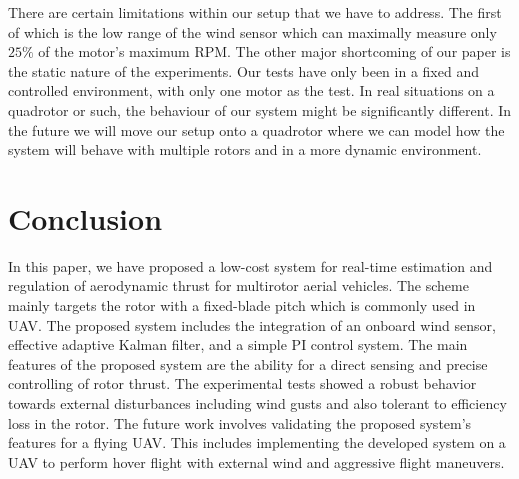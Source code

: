 \documentclass[conference]{IEEEtran}
\begin{document}
There are certain limitations within our setup that we have to address. The first of which is the low range of the wind sensor which can maximally measure only $25\%$ of the motor's maximum RPM. The other major shortcoming of our paper is the static nature of the experiments. Our tests have only been in a fixed and controlled environment, with only one motor as the test. In real situations on a quadrotor or such, the behaviour of our system might be significantly different. In the future we will move our setup onto a quadrotor where we can model how the system will behave with multiple rotors and in a more dynamic environment.
\section{Conclusion}

In this paper, we have proposed a low-cost system for real-time estimation and regulation of aerodynamic thrust for multirotor aerial vehicles. The scheme mainly targets the rotor with a fixed-blade pitch which is commonly used in UAV. The proposed system includes the integration of an onboard wind sensor, effective adaptive Kalman filter, and a simple PI control system. The main features of the proposed system are the ability for a direct sensing and precise controlling of rotor thrust. The experimental tests showed a robust behavior towards external disturbances including wind gusts and also tolerant to efficiency loss in the rotor. 
The future work involves validating the proposed system’s features for a flying UAV. This includes implementing the developed system on a UAV to perform hover flight with external wind and aggressive flight maneuvers. 
\end{document}
